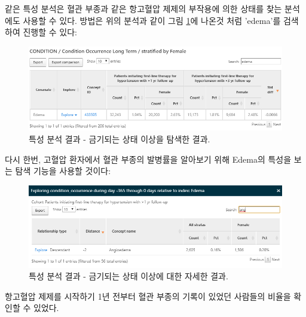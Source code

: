 \documentclass[11pt]{book}
\theoremstyle{definition}
\theoremstyle{definition}
\theoremstyle{definition}
\theoremstyle{remark}
\begin{document}
같은 특성 분석은 혈관 부종과 같은 항고혈압 제제의 부작용에 의한 상태를
찾는 분석에도 사용할 수 있다. 방법은 위의 분석과 같이 그림
\ref{fig:atlasCharacterizationResultsContra}에 나온것 처럼 'edema'를
검색하여 진행할 수 있다:

\begin{figure}

{\centering \includegraphics[width=1\linewidth]{images/Characterization/atlasCharacterizationResultsContra} 

}

\caption{특성 분석 결과 - 금기되는 상태 이상을 탐색한 결과.}\label{fig:atlasCharacterizationResultsContra}
\end{figure}

다시 한번, 고혈압 환자에서 혈관 부종의 발병률을 알아보기 위해 Edema의
특성을 보는 탐색 기능을 사용할 것이다:

\begin{figure}

{\centering \includegraphics[width=1\linewidth]{images/Characterization/atlasCharacterizationResultsContraExplore} 

}

\caption{특성 분석 결과 - 금기되는 상태 이상에 대한 자세한 결과.}\label{fig:atlasCharacterizationResultsContraExplore}
\end{figure}

항고혈압 제제를 시작하기 1년 전부터 혈관 부종의 기록이 있었던 사람들의
비율을 확인할 수 있었다.
\end{document}
